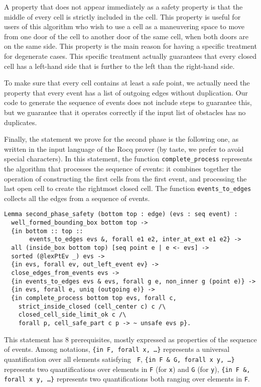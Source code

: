 \documentclass[a4paper, USenglish, cleveref, autoref, thm-restate, final]{lipics-v2021}
\begin{document}
A property that does not appear immediately as a safety property is
that the middle of every cell is strictly included in the cell.  This
property is useful for users of this algorithm who wish to use a cell
as a maneuvering space to move from one door of the cell to another door of
the same cell, when both doors are on the same side.  This property is
the main reason for having a specific treatment for degenerate cases.
This specific treatment actually guarantees that every closed cell has
a left-hand side that is further to the left than the
right-hand side.

To make sure that every cell contains at least a safe point, we
actually need the property that every event has a list of outgoing
edges without duplication.  Our code to generate the sequence of
events does not include steps to guarantee this, but we guarantee
that it operates correctly if the input
list of obstacles has no duplicates.

Finally, the statement we prove for the second phase is the following one,
as written in the input language of the Rocq prover (by taste, we prefer
to avoid special characters).  In this statement, the function
{\tt complete\_process} represents the algorithm that processes the sequence of
events: it combines together the operation of constructing the first cells
from the first event, and processing the last open cell to create the rightmost
closed cell.  The function {\tt events\_to\_edges} collects all the edges
from a sequence of events.
\begin{verbatim}
Lemma second_phase_safety (bottom top : edge) (evs : seq event) :
  well_formed_bounding_box bottom top ->
  {in bottom :: top ::
       events_to_edges evs &, forall e1 e2, inter_at_ext e1 e2} ->
  all (inside_box bottom top) [seq point e | e <- evs] ->
  sorted (@lexPtEv _) evs ->
  {in evs, forall ev, out_left_event ev} ->
  close_edges_from_events evs ->
  {in events_to_edges evs & evs, forall g e, non_inner g (point e)} ->
  {in evs, forall e, uniq (outgoing e)} ->
  {in complete_process bottom top evs, forall c,
    strict_inside_closed (cell_center c) c /\
    closed_cell_side_limit_ok c /\
    forall p, cell_safe_part c p -> ~ unsafe evs p}.
\end{verbatim}
This statement has 8 prerequisites, mostly expressed as properties of the
sequence of events.  Among notations, {\tt \{in F, forall x, \dots\}}
represents a universal quantification over all elements satisfying {\tt
  F}, {\tt \{in F \& G, forall x y, \dots\}} represents two
quantifications over elements in {\tt F} (for {\tt x}) and {\tt G}
(for {\tt y}), {\tt \{in F \&, forall x y, \dots\}} represents two
quantifications both ranging over elements in {\tt F}.
\end{document}
